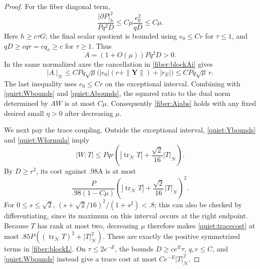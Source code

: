 \begin{proof}
For the fiber diagonal term,
\[
 \frac{|\partial P|_h^2}{Pq^2D}
 \le C\mu\frac{e_0^2}{qD}\le C\mu.
\]
Here \(h\ge c\tau G\); the final scalar quotient is bounded using
\(e_0\le Cr\) for \(\tau\le1\), and
\(qD\ge cqr=cq_x\ge c\) for \(\tau\ge1\).
Thus
\begin{equation}\label{quiet:Abounds}
 A=(1+O(\mu))Pq^2D>0.
\end{equation}
In the same normalized axes the cancellation in
\eqref{fiber:blockAi} gives
\[
 |A_{\cdot}|_{\mathcal N}
 \le CPq\sqrt\mu\bigl(|e_0|(r+\|\mathbf Y\|)+|r_E|\bigr)
 \le CPq\sqrt\mu\,r.
\]
The last inequality uses \(e_0\le Cr\) on the exceptional interval.
Combining with \eqref{quiet:Wbounds} and
\eqref{quiet:Abounds}, the squared ratio to the dual norm determined
by \(AW\) is at most \(C\mu\).  Consequently
\eqref{fiber:Aiabs} holds with any fixed desired small \(\eta>0\)
after decreasing \(\mu\).

We next pay the trace coupling.  Outside the exceptional interval,
\eqref{quiet:Ybounds} and \eqref{quiet:Wformula} imply
\[
 |W:T|\le Pqr\left(|\operatorname{tr}_{\mathcal N}T|
                       +\frac{\sqrt2}{16}|T|_{\mathcal N}\right).
\]
By \(D\ge r^2\), its cost against .98A is at most
\begin{equation}\label{quiet:tracecost}
 \frac P{.98(1-C\mu)}
 \left(|\operatorname{tr}_{\mathcal N}T|
                       +\frac{\sqrt2}{16}|T|_{\mathcal N}\right)^2.
\end{equation}
For \(0\le s\le\sqrt2\),
\((s+\sqrt2/16)^2/(1+s^2)<.8\); this can also be checked by
differentiating, since its maximum on this interval occurs at the
right endpoint.  Because \(T\) has rank at most two, decreasing \(\mu\)
therefore makes \eqref{quiet:tracecost} at most
\(.85P((\operatorname{tr}_{\mathcal N}T)^2+|T|_{\mathcal N}^2)\).
These are exactly the positive symmetrized terms in
\eqref{fiber:blockL}.
On \(\tau\le2e^{-E}\), the bounds
\(D\ge c e^E\tau\), \(q,r\le C\), and
\eqref{quiet:Wbounds} instead give a trace cost at most
\(Ce^{-E}|T|_{\mathcal N}^2\).


\end{proof}
